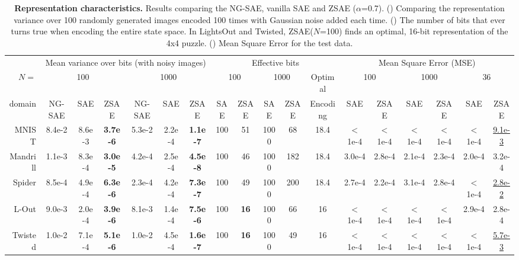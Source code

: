 \begin{table}[tbp]
 \centering
 \begin{adjustbox}{width={\linewidth},keepaspectratio}
 \begin{tabular}{|r|*{17}{c|}}
       & \multicolumn{6}{c|}{Mean variance over bits (with noisy images)}
       & \multicolumn{5}{c|}{Effective bits}
       & \multicolumn{6}{c|}{Mean Square Error (MSE)}
  \\
$N=$ & \multicolumn{3}{c|}{100} & \multicolumn{3}{c|}{1000}
     & \multicolumn{2}{c|}{100} & \multicolumn{2}{c|}{1000}
     & Optimal
     & \multicolumn{2}{c|}{100} & \multicolumn{2}{c|}{1000} & \multicolumn{2}{c|}{36}
  \\
domain    & NG-SAE & SAE    & ZSAE            & NG-SAE & SAE    & ZSAE            & SAE & ZSAE        & SAE  & ZSAE & Encoding & SAE     & ZSAE   & SAE    & ZSAE   & SAE    & ZSAE           \\ 
MNIST     & 8.4e-2 & 8.6e-3 & \textbf{3.7e-6} & 5.3e-2 & 2.2e-4 & \textbf{1.1e-7} & 100 & 51          & 1000 & 68   & 18.4     & $<$1e-4 &$<$1e-4 &$<$1e-4 &$<$1e-4 &$<$1e-4 &\uline{9.1e-3}  \\ 
Mandrill  & 1.1e-3 & 8.3e-4 & \textbf{3.0e-5} & 4.2e-4 & 2.5e-4 & \textbf{4.5e-8} & 100 & 46          & 1000 & 182  & 18.4     & 3.0e-4  &2.8e-4  &2.1e-4  &2.3e-4  &2.0e-4  &{3.2e-4}        \\ 
Spider    & 8.5e-4 & 4.9e-4 & \textbf{6.3e-6} & 2.3e-4 & 4.2e-4 & \textbf{7.3e-7} & 100 & 49          & 1000 & 200  & 18.4     & 2.7e-4  &2.2e-4  &3.1e-4  &2.8e-4  &$<$1e-4 &\uline{2.8e-2}  \\ 
L-Out     & 9.0e-3 & 2.0e-4 & \textbf{3.9e-6} & 8.1e-3 & 1.4e-4 & \textbf{7.5e-6} & 100 & \textbf{16} & 1000 & 66   & 16       & $<$1e-4 &$<$1e-4 &$<$1e-4 &$<$1e-4 &2.9e-4  &{2.8e-4}        \\ 
Twisted   & 1.0e-2 & 7.1e-4 & \textbf{5.1e-6} & 1.0e-2 & 4.5e-4 & \textbf{1.6e-7} & 100 & \textbf{16} & 1000 & 49   & 16       & $<$1e-4 &$<$1e-4 &$<$1e-4 &$<$1e-4 &$<$1e-4 &\uline{5.7e-3}  \\ 
\end{tabular}
\end{adjustbox}
 \caption{\textbf{Representation characteristics.}
Results comparing the NG-SAE, vanilla SAE and ZSAE ($\alpha$=0.7).
() Comparing the representation variance over 100 randomly generated images encoded 100 times with Gaussian noise added each time.
() The number of bits that ever turns true when encoding the entire state space.
 In LightsOut and Twisted, ZSAE($N$=100) finds an optimal, 16-bit representation of the 4x4 puzzle.
() Mean Square Error for the test data.
 }
\label{tab:stability}
\end{table}

